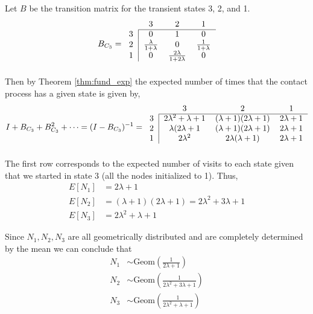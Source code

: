 \documentclass{article}
\theoremstyle{plain}
\theoremstyle{definition}
\theoremstyle{remark}
\numberwithin{equation}{section}
\begin{document}
Let $B$ be the transition matrix for the transient states 3, 2, and 1.
$$
B_{C_3} = \begin{blockarray}{cccc}
    & 3 & 2 & 1\\
    \begin{block}{c|ccc}
    \cline{2-4}
        3 & 0 & 1 & 0\\
        2 & \frac{\lambda}{1 + \lambda} & 0 &
        \frac{1}{1 + \lambda}\\
        1 & 0 & \frac{2\lambda}{1 + 2 \lambda} & 0\\
    \end{block}
    \end{blockarray}
$$
Then by Theorem \ref{thm:fund_exp} the expected number of times that the contact process has a given state is given by,
$$
    I + B_{C_3} + B_{C_3}^2 + \cdots = (I - B_{C_3})^{-1} = \begin{blockarray}{cccc}
    & 3 & 2 & 1\\
    \begin{block}{c|ccc}
    \cline{2-4}
    3 & 2 \lambda^2 + \lambda + 1 & (\lambda + 1) (2 \lambda + 1) &  2 \lambda + 1\\
    2 & \lambda (2 \lambda + 1 & (\lambda + 1)(2 \lambda + 1) & 2 \lambda + 1\\
    1 & 2 \lambda^2 & 2 \lambda ( \lambda + 1) &  2\lambda + 1\\
    \end{block}
    \end{blockarray}
$$
The first row corresponds to the expected number of visits to each state given that we started in state 3 (all the nodes initialized to 1).
Thus,
\begin{align*}
    E[N_1] &= 2 \lambda + 1\\
    E[N_2] &= (\lambda + 1) (2 \lambda + 1) = 2\lambda^2 + 3 \lambda + 1\\
    E[N_3] &=  2 \lambda^2 + \lambda + 1
\end{align*}

Since $N_1, N_2, N_3$ are all geometrically distributed and are completely determined by the mean we can conclude that
\begin{align*}
    N_1 &\sim  \text{Geom}\left(\frac{1}{2 \lambda + 1} \right)\\
    N_2 &\sim \text{Geom}\left(\frac{1}{2\lambda^2 + 3 \lambda + 1} \right)\\
    N_3 &\sim  \text{Geom}\left(\frac{1}{2 \lambda^2 + \lambda + 1}\right)
\end{align*}
\end{document}
